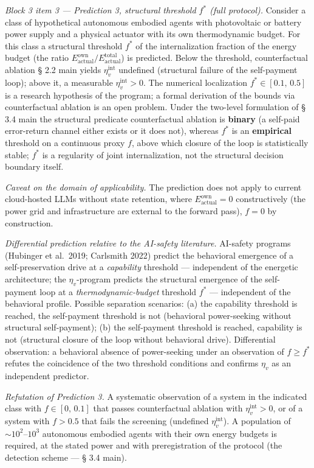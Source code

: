 \documentclass[pdflatex,sn-mathphys-ay]{sn-jnl}
\begin{document}
\emph{Block 3 item 3 --- Prediction 3, structural threshold \(f^*\) (full protocol).} Consider a class of hypothetical autonomous embodied agents with photovoltaic or battery power supply and a physical actuator with its own thermodynamic budget. For this class a structural threshold \(f^*\) of the internalization fraction of the energy budget (the ratio \(E_{\text{actual}}^{\text{own}}/E_{\text{actual}}^{\text{total}}\)) is predicted. Below the threshold, counterfactual ablation § 2.2 main yields \(\eta_v^{\text{int}}\) undefined (structural failure of the self-payment loop); above it, a measurable \(\eta_v^{\text{int}} > 0\). The numerical localization \(f^* \in [0.1,\, 0.5]\) is a research hypothesis of the program; a formal derivation of the bounds via counterfactual ablation is an open problem. Under the two-level formulation of § 3.4 main the structural predicate counterfactual ablation is \textbf{binary} (a self-paid error-return channel either exists or it does not), whereas \(f^*\) is an \textbf{empirical} threshold on a continuous proxy \(f\), above which closure of the loop is statistically stable; \(f^*\) is a regularity of joint internalization, not the structural decision boundary itself.

\emph{Caveat on the domain of applicability.} The prediction does not apply to current cloud-hosted LLMs without state retention, where \(E_{\text{actual}}^{\text{own}} = 0\) constructively (the power grid and infrastructure are external to the forward pass), \(f = 0\) by construction.

\emph{Differential prediction relative to the AI-safety literature.} AI-safety programs (Hubinger et al.~2019; Carlsmith 2022) predict the behavioral emergence of a self-preservation drive at a \emph{capability} threshold --- independent of the energetic architecture; the \(\eta_v\)-program predicts the structural emergence of the self-payment loop at a \emph{thermodynamic-budget} threshold \(f^*\) --- independent of the behavioral profile. Possible separation scenarios: (a) the capability threshold is reached, the self-payment threshold is not (behavioral power-seeking without structural self-payment); (b) the self-payment threshold is reached, capability is not (structural closure of the loop without behavioral drive). Differential observation: a behavioral absence of power-seeking under an observation of \(f \ge f^*\) refutes the coincidence of the two threshold conditions and confirms \(\eta_v\) as an independent predictor.

\emph{Refutation of Prediction 3.} A systematic observation of a system in the indicated class with \(f \in [0,\, 0.1]\) that passes counterfactual ablation with \(\eta_v^{\text{int}} > 0\), or of a system with \(f > 0.5\) that fails the screening (undefined \(\eta_v^{\text{int}}\)). A population of \(\sim 10^2\)--\(10^3\) autonomous embodied agents with their own energy budgets is required, at the stated power and with preregistration of the protocol (the detection scheme --- § 3.4 main).
\end{document}

